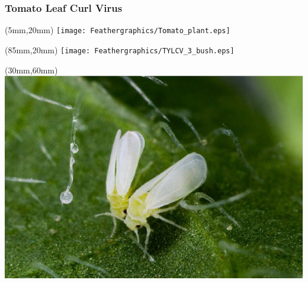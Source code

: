 \begin{frame}
	\frametitle{Tomato Leaf Curl Virus}
		\begin{textblock*}{40mm}(5mm,20mm)
			\texttt{[image: Feathergraphics/Tomato\_plant.eps]}
		\end{textblock*}
	
		\begin{textblock*}{30mm}(85mm,20mm)
			\texttt{[image: Feathergraphics/TYLCV\_3\_bush.eps]}
		\end{textblock*}
	{	
		\begin{textblock*}{45mm}(30mm,60mm)
			\includegraphics[width=\linewidth]{Feathergraphics/Mosca_Blanca.eps}
		\end{textblock*}
	}
\end{frame}
